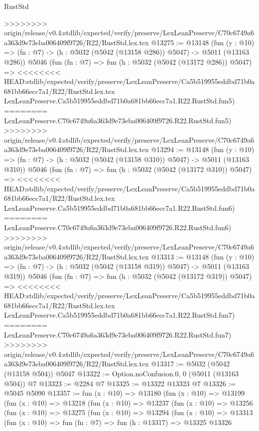 \begin{lexlean}{RustStd}
\begin{coremodule}
{\begin{coremodule}
{{{{{{{{{{{{>>>>>>>> origin/release/v0.4:stdlib/expected/verify/preserve/LexLeanPreserve/C70c6749a6a363d9e73eba006409f9726/R22/RustStd.lex.tex
@13275 := @13148
    (fun (y : @10) => (fn : @7) -> (h : @5032 (@5042 (@13158 @286)) @5047) -> @5011 (@13163 @286))
    @5046
    (fun (fn : @7) =>
    fun (h : @5032 (@5042 (@13172 @286)) @5047) =>
<<<<<<<< HEAD:stdlib/expected/verify/preserve/LexLeanPreserve/Ca5b519955eddbd71b0a681bb66ecc7a1/R22/RustStd.lex.tex
    LexLeanPreserve.Ca5b519955eddbd71b0a681bb66ecc7a1.R22.RustStd.fun5)
========
    LexLeanPreserve.C70c6749a6a363d9e73eba006409f9726.R22.RustStd.fun5)
>>>>>>>> origin/release/v0.4:stdlib/expected/verify/preserve/LexLeanPreserve/C70c6749a6a363d9e73eba006409f9726/R22/RustStd.lex.tex
@13294 := @13148
    (fun (y : @10) => (fn : @7) -> (h : @5032 (@5042 (@13158 @310)) @5047) -> @5011 (@13163 @310))
    @5046
    (fun (fn : @7) =>
    fun (h : @5032 (@5042 (@13172 @310)) @5047) =>
<<<<<<<< HEAD:stdlib/expected/verify/preserve/LexLeanPreserve/Ca5b519955eddbd71b0a681bb66ecc7a1/R22/RustStd.lex.tex
    LexLeanPreserve.Ca5b519955eddbd71b0a681bb66ecc7a1.R22.RustStd.fun6)
========
    LexLeanPreserve.C70c6749a6a363d9e73eba006409f9726.R22.RustStd.fun6)
>>>>>>>> origin/release/v0.4:stdlib/expected/verify/preserve/LexLeanPreserve/C70c6749a6a363d9e73eba006409f9726/R22/RustStd.lex.tex
@13313 := @13148
    (fun (y : @10) => (fn : @7) -> (h : @5032 (@5042 (@13158 @319)) @5047) -> @5011 (@13163 @319))
    @5046
    (fun (fn : @7) =>
    fun (h : @5032 (@5042 (@13172 @319)) @5047) =>
<<<<<<<< HEAD:stdlib/expected/verify/preserve/LexLeanPreserve/Ca5b519955eddbd71b0a681bb66ecc7a1/R22/RustStd.lex.tex
    LexLeanPreserve.Ca5b519955eddbd71b0a681bb66ecc7a1.R22.RustStd.fun7)
========
    LexLeanPreserve.C70c6749a6a363d9e73eba006409f9726.R22.RustStd.fun7)
>>>>>>>> origin/release/v0.4:stdlib/expected/verify/preserve/LexLeanPreserve/C70c6749a6a363d9e73eba006409f9726/R22/RustStd.lex.tex
@13317 := @5032 (@5042 (@13158 @504)) @5047
@13322 := Option.noConfusion.{0, 0} (@5011 (@13163 @504)) @7
@13323 := @2284 @7
@13325 := @13322 @13323 @7
@13326 := @5045 @5090
@13357 := fun (x : @10) =>
  @13180
    (fun (x : @10) =>
    @13199
      (fun (x : @10) =>
      @13218
        (fun (x : @10) =>
        @13237
          (fun (x : @10) =>
          @13256
            (fun (x : @10) =>
            @13275
              (fun (x : @10) =>
              @13294
                (fun (x : @10) =>
                @13313
                  (fun (x : @10) =>
                  fun (fn : @7) =>
                  fun (h : @13317) =>
                  @13325
                    @13326
}}}}}}}}}}}}
\end{coremodule}}
\end{coremodule}
\end{lexlean}
